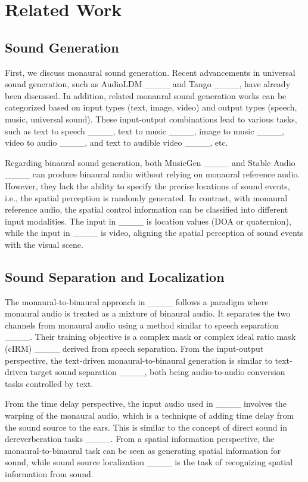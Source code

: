 \section{Related Work}
\label{sec:re}
\subsection{Sound Generation}
First, we discuss monaural sound generation. Recent advancements in universal sound generation, such as AudioLDM ____ and Tango ____, have already been discussed. In addition, related monaural sound generation works can be categorized based on input types (text, image, video) and output types (speech, music, universal sound). These input-output combinations lead to various tasks, such as text to speech ____, text to music ____, image to music ____, video to audio ____, and text to audible video ____, etc.

Regarding binaural sound generation, both MusicGen ____ and Stable Audio ____ can produce binaural audio without relying on monaural reference audio. However, they lack the ability to specify the precise locations of sound events, i.e., the spatial perception is randomly generated. In contrast, with monaural reference audio, the spatial control information can be classified into different input modalities. The input in ____ is location values (DOA or quaternion), while the input in ____ is video, aligning the spatial perception of sound events with the visual scene.

\subsection{Sound Separation and Localization}
The monaural-to-binaural approach in ____ follows a paradigm where monaural audio is treated as a mixture of binaural audio. It separates the two channels from monaural audio using a method similar to speech separation ____. Their training objective is a complex mask or complex ideal ratio mask (cIRM) ____ derived from speech separation. From the input-output perspective, the text-driven monaural-to-binaural generation is similar to text-driven target sound separation ____, both being audio-to-audio conversion tasks controlled by text.

From the time delay perspective, the input audio used in ____ involves the warping of the monaural audio, which is a technique of adding time delay from the sound source to the ears. This is similar to the concept of direct sound in dereverberation tasks ____. From a spatial information perspective, the monaural-to-binaural task can be seen as generating spatial information for sound, while sound source localization ____ is the task of recognizing spatial information from sound.
